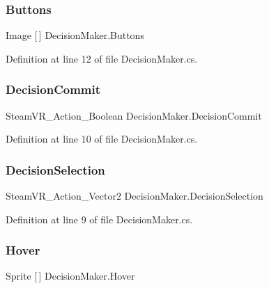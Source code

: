 \subsubsection{\texorpdfstring{Buttons}{Buttons}}
{\footnotesize\ttfamily Image \mbox{[}$\,$\mbox{]} Decision\+Maker.\+Buttons}



Definition at line 12 of file Decision\+Maker.\+cs.

\mbox{\label{class_decision_maker_adf1e2a6e9420d716bcd9cd87a982fdef}} 
\subsubsection{\texorpdfstring{DecisionCommit}{DecisionCommit}}
{\footnotesize\ttfamily Steam\+V\+R\+\_\+\+Action\+\_\+\+Boolean Decision\+Maker.\+Decision\+Commit}



Definition at line 10 of file Decision\+Maker.\+cs.

\mbox{\label{class_decision_maker_ab4e8b64116e631733740e6c872ca34d2}} 
\subsubsection{\texorpdfstring{DecisionSelection}{DecisionSelection}}
{\footnotesize\ttfamily Steam\+V\+R\+\_\+\+Action\+\_\+\+Vector2 Decision\+Maker.\+Decision\+Selection}



Definition at line 9 of file Decision\+Maker.\+cs.

\mbox{\label{class_decision_maker_a326799f4e5c3e22f67b94e3db746c693}} 
\subsubsection{\texorpdfstring{Hover}{Hover}}
{\footnotesize\ttfamily Sprite \mbox{[}$\,$\mbox{]} Decision\+Maker.\+Hover}



